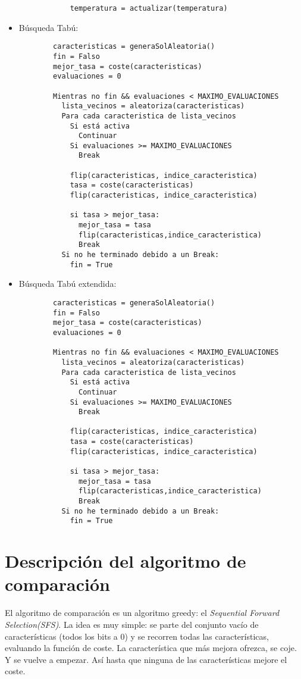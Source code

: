 \documentclass[a4paper, 11pt]{article}
\begin{document}
\begin{itemize}
\begin{verbatim}
            temperatura = actualizar(temperatura)
      \end{verbatim}
      \item Búsqueda Tabú:
      \begin{verbatim}
        caracteristicas = generaSolAleatoria()
        fin = Falso
        mejor_tasa = coste(caracteristicas)
        evaluaciones = 0

        Mientras no fin && evaluaciones < MAXIMO_EVALUACIONES
          lista_vecinos = aleatoriza(caracteristicas)
          Para cada caracteristica de lista_vecinos
            Si está activa
              Continuar
            Si evaluaciones >= MAXIMO_EVALUACIONES
              Break

            flip(caracteristicas, indice_caracteristica)
            tasa = coste(caracteristicas)
            flip(caracteristicas, indice_caracteristica)

            si tasa > mejor_tasa:
              mejor_tasa = tasa
              flip(caracteristicas,indice_caracteristica)
              Break
          Si no he terminado debido a un Break:
            fin = True
      \end{verbatim}
      \item Búsqueda Tabú extendida:
      \begin{verbatim}
        caracteristicas = generaSolAleatoria()
        fin = Falso
        mejor_tasa = coste(caracteristicas)
        evaluaciones = 0

        Mientras no fin && evaluaciones < MAXIMO_EVALUACIONES
          lista_vecinos = aleatoriza(caracteristicas)
          Para cada caracteristica de lista_vecinos
            Si está activa
              Continuar
            Si evaluaciones >= MAXIMO_EVALUACIONES
              Break

            flip(caracteristicas, indice_caracteristica)
            tasa = coste(caracteristicas)
            flip(caracteristicas, indice_caracteristica)

            si tasa > mejor_tasa:
              mejor_tasa = tasa
              flip(caracteristicas,indice_caracteristica)
              Break
          Si no he terminado debido a un Break:
            fin = True
      \end{verbatim}
    \end{itemize}
  \section{Descripción del algoritmo de comparación}
    El algoritmo de comparación es un algoritmo greedy: el \emph{Sequential Forward Selection(SFS)}. La idea es muy simple: se parte del conjunto vacío de características (todos los bits a 0) y se recorren todas las características, evaluando la función de coste. La característica que más mejora ofrezca, se coje. Y se vuelve a empezar. Así hasta que ninguna de las características mejore el coste.
\end{document}
